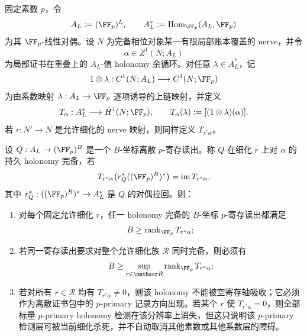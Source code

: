 \begin{theorem}\label{distill:cech_cohomology-local_to_global_certificate_descent-biaxial-persistent-holonomy-register-bound}
固定素数 \(p\)，令
\[
A_L:=(\FF_p)^L,
\qquad
A_L^\ast:=\operatorname{Hom}_{\FF_p}(A_L,\FF_p)
\]
为其 \(\FF_p\)-线性对偶。设 \(N\) 为完备相位对象某一有限局部账本覆盖的 nerve，并令
\[
\alpha\in Z^1(N;A_L)
\]
为局部证书在重叠上的 \(A_L\)-值 holonomy 余循环。对任意 \(\lambda\in A_L^\ast\)，记
\[
1\otimes\lambda:C^1(N;A_L)\longrightarrow C^1(N;\FF_p)
\]
为由系数映射 \(\lambda:A_L\to\FF_p\) 逐项诱导的上链映射，并定义
\[
T_\alpha:A_L^\ast\longrightarrow \check H^1(N;\FF_p),
\qquad
T_\alpha(\lambda):=[(1\otimes\lambda)(\alpha)].
\]
若 \(r:N'\to N\) 是允许细化的 nerve 映射，则同样定义 \(T_{r^\ast\alpha}\)。

设 \(Q:A_L\to(\FF_p)^B\) 是一个 \(B\)-坐标离散 \(p\)-寄存读出。称 \(Q\) 在细化 \(r\) 上对 \(\alpha\) 的持久 holonomy 完备，若
\[
T_{r^\ast\alpha}\bigl(r_Q^\ast((\FF_p)^B)^\ast\bigr)
=\operatorname{im}T_{r^\ast\alpha},
\]
其中 \(r_Q^\ast:((\FF_p)^B)^\ast\to A_L^\ast\) 是 \(Q\) 的对偶拉回。则：
\begin{enumerate}
  \item 对每个固定允许细化 \(r\)，任一 holonomy 完备的 \(B\)-坐标 \(p\)-寄存读出都满足
  \[
  B\ge \operatorname{rank}_{\FF_p}T_{r^\ast\alpha};
  \]
  \item 若同一寄存读出要求对整个允许细化族 \(\mathscr R\) 同时完备，则必须有
  \[
  B\ge
  \sup_{r\in\mathscr R}\operatorname{rank}_{\FF_p}T_{r^\ast\alpha};
  \]
  \item 若对所有 \(r\in\mathscr R\) 均有 \(T_{r^\ast\alpha}\ne0\)，则该 holonomy 不能被空寄存轴吸收；它必须作为离散证书包中的 \(p\)-primary 记录方向出现。若某个 \(r\) 使 \(T_{r^\ast\alpha}=0\)，则全部标量 \(p\)-primary holonomy 检测在该分辨率上消失，但这只说明该 \(p\)-primary 检测层可被当前细化杀死，并不自动取消其他素数或其他系数层的障碍。
\end{enumerate}
\end{theorem}

